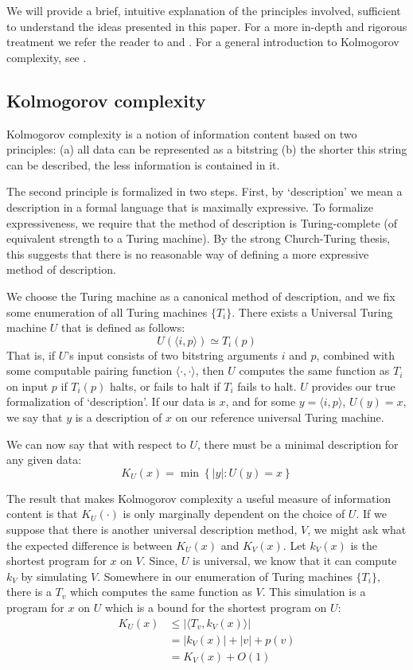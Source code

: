 \documentclass{article}
\begin{document}
We will provide a brief, intuitive explanation of the principles involved, sufficient to understand the ideas presented in this paper. For a more in-depth and rigorous treatment we refer the reader to \cite{li2004similarity} and \cite{cilibrasi2005clustering}. For a general introduction to Kolmogorov complexity, see \cite{li1997introduction}.

\subsection*{Kolmogorov complexity}

Kolmogorov complexity is a notion of information content based on two principles: (a) all data can be represented as a bitstring (b) the shorter this string can be described, the less information is contained in it.

The second principle is formalized in two steps. First, by `description' we mean a description in a formal language that is maximally expressive. To formalize expressiveness, we require that the method of description is Turing-complete (of equivalent strength to a Turing machine). By the strong Church-Turing thesis, this suggests that there is no reasonable way of defining a more expressive method of description.

We choose the Turing machine as a canonical method of description, and we fix some enumeration of all Turing machines $\{T_i\}$. There exists a Universal Turing machine $U$ that is defined as follows:
\[
U(\langle i, p\rangle) \simeq T_i(p)
\] 
That is, if $U$'s input consists of two bitstring arguments $i$ and $p$, combined with some computable pairing function $\langle \cdot, \cdot\rangle$, then $U$ computes the same function as $T_i$ on input $p$ if $T_i(p)$ halts, or fails to halt if $T_i$ fails to halt. $U$ provides our true formalization of `description'. If our data is $x$, and for some $y = \langle i, p\rangle$, $U(y) = x$, we say that $y$ is a description of $x$ on our reference universal Turing machine.  

We can now say that with respect to $U$, there must be a minimal description for any given data:
\[
K_U(x) = \min\left \{|y| : U(y) = x\right\} 
\]

The result that makes Kolmogorov complexity a useful measure of information content is that $K_U(\cdot)$ is only marginally dependent on the choice of $U$. If we suppose that there is another universal description method, $V$, we might ask what the expected difference is between $K_U(x)$ and $K_V(x)$. Let $k_V(x)$ is the shortest program for $x$ on $V$. Since, $U$ is universal, we know that it can compute $k_V$ by simulating $V$. Somewhere in our enumeration of Turing machines $\{T_i\}$, there is a $T_v$ which computes the same function as $V$. This simulation is a program for $x$ on $U$ which is a bound for the shortest program on $U$:
\begin{align*}
K_U(x) 	&\leq |\langle T_v, k_V(x)\rangle|\\ 
		&=  |k_V(x)| + |v| + p(v) \\
		&=  K_V(x) + O(1)
\end{align*}
\end{document}
